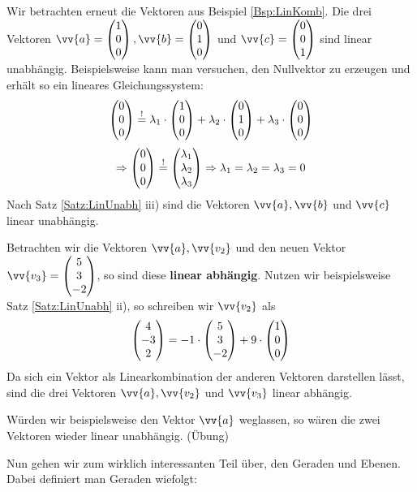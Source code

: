 \documentclass[ngerman, 12pt]{nssheetxea}
\begin{document}
\begin{example}
Wir betrachten erneut die Vektoren aus Beispiel \ref{Bsp:LinKomb}. Die drei Vektoren $\vv{a}=\colvec[1]{0}{0}, \vv{b}=\colvec[0]{1}{0}$ und $\vv{c}=\colvec[0]{0}{1}$ sind linear unabhängig. Beispielsweise kann man versuchen, den Nullvektor zu erzeugen und erhält so ein lineares Gleichungssystem:
\[ \colvec[0]{0}{0} \overset{!}{=} \lambda_1 \cdot \colvec[1]{0}{0} + \lambda_2 \cdot \colvec[0]{1}{0} + \lambda_3 \cdot \colvec[0]{0}{0} \]
\[ \Rightarrow \colvec[0]{0}{0} \stackrel{!}{=} \colvec[\lambda_1]{\lambda_2}{\lambda_3} \Rightarrow \lambda_1 = \lambda_2 = \lambda_3 = 0\]
Nach Satz \ref{Satz:LinUnabh} iii) sind die Vektoren $\vv{a}, \vv{b}$ und $\vv{c}$ linear unabhängig. \par
Betrachten wir die Vektoren $\vv{a}, \vv{v_2}$ und den neuen Vektor $\vv{v_3}=\colvec[5]{3}{-2}$, so sind diese \textbf{linear abhängig}. Nutzen wir beispielsweise Satz \ref{Satz:LinUnabh} ii), so schreiben wir $\vv{v_2}$ als
\[ \colvec[4]{-3}{2} = -1\cdot \colvec[5]{3}{-2} + 9 \cdot \colvec[1]{0}{0}   \]
Da sich ein Vektor als Linearkombination der anderen Vektoren darstellen lässt, sind die drei Vektoren $\vv{a}, \vv{v_2}$ und $\vv{v_3}$ linear abhängig. \par
Würden wir beispielsweise den Vektor $\vv{a}$ weglassen, so wären die zwei Vektoren wieder linear unabhängig. (Übung)
\end{example}

Nun gehen wir zum wirklich interessanten Teil über, den Geraden und Ebenen. Dabei definiert man Geraden wiefolgt:
\end{document}
